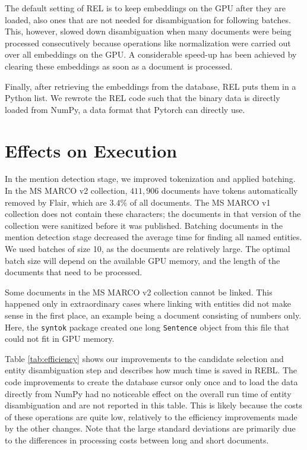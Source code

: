 The default setting of REL is to keep embeddings on the GPU after they are loaded, also ones that are not needed for disambiguation for following batches.
This, however, slowed down disambiguation when many documents were being processed consecutively because operations like normalization were carried out over all embeddings on the GPU. 
A considerable speed-up has been achieved by clearing these embeddings as soon as a document is processed.

Finally, after retrieving the embeddings from the database, REL puts them in a Python list. We rewrote the REL code such that the binary data is directly loaded from NumPy, a data format that Pytorch can directly use. 

\section{Effects on Execution}
In the mention detection stage, we improved tokenization and applied batching. In the MS MARCO v2 collection, $411,906$ documents have tokens automatically removed by Flair, which are $3.4\%$ of all documents. The MS MARCO v1 collection does not contain these characters; the documents in that version of the collection were sanitized before it was published.
Batching documents in the mention detection stage decreased the average time for finding all named entities. We used batches of size 10, as the documents are relatively large. The optimal batch size will depend on the available GPU memory, and the length of the documents that need to be processed.

Some documents in the MS MARCO v2 collection cannot be linked. This happened only in extraordinary cases where linking with entities did not make sense in the first place, an example being a document consisting of numbers only. Here, the \texttt{syntok} package created one long \texttt{Sentence} object from this file that could not fit in GPU memory.

Table \ref{tab:efficiency} shows our improvements to the candidate selection and entity disambiguation step and describes how much time is saved in REBL. 
The code improvements to create the database cursor only once and to load the data directly from NumPy had no noticeable effect on the overall run time of entity disambiguation and are not reported in this table. This is likely because the costs of these operations are quite low, relatively to the efficiency improvements made by the other changes.
Note that the large standard deviations are primarily due to the differences in processing costs between long and short documents.

